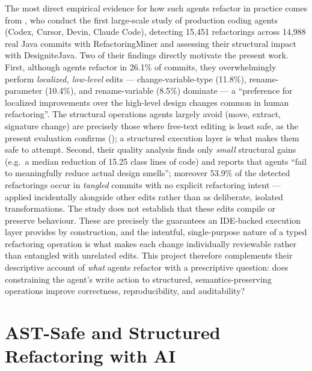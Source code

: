 The most direct empirical evidence for how such agents refactor in practice comes
from \citet{agenticrefactoring2025}, who conduct the first large-scale study of
production coding agents (Codex, Cursor, Devin, Claude Code), detecting 15{,}451
refactorings across 14{,}988 real Java commits with RefactoringMiner and assessing
their structural impact with DesigniteJava. Two of their findings directly motivate
the present work. First, although agents refactor in 26.1\% of commits, they
overwhelmingly perform \emph{localized, low-level} edits --- change-variable-type
(11.8\%), rename-parameter (10.4\%), and rename-variable (8.5\%) dominate --- a
``preference for localized improvements over the high-level design changes common
in human refactoring''. The structural operations agents largely avoid (move,
extract, signature change) are precisely those where free-text editing is least
safe, as the present evaluation confirms (); a structured execution
layer is what makes them safe to attempt. Second, their quality analysis finds only
\emph{small} structural gains (e.g.\ a median reduction of 15.25 class lines of
code) and reports that agents ``fail to meaningfully reduce actual design
smells''; moreover 53.9\% of the detected refactorings occur in \emph{tangled}
commits with no explicit refactoring intent --- applied incidentally alongside
other edits rather than as deliberate, isolated transformations. The study does
not establish that these edits compile or preserve behaviour. These are precisely
the guarantees an IDE-backed execution layer provides by construction, and the
intentful, single-purpose nature of a typed refactoring operation is what makes
each change individually reviewable rather than entangled with unrelated edits.
This project therefore complements their descriptive account of \emph{what} agents
refactor with a prescriptive question: does constraining the agent's write action
to structured, semantics-preserving operations improve correctness, reproducibility,
and auditability?

\section{AST-Safe and Structured Refactoring with AI}
\label{sec:bg-structured}

